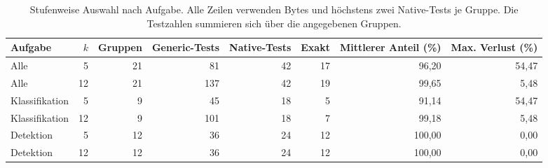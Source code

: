 \begin{table}[t]
\centering\small
\caption{Stufenweise Auswahl nach Aufgabe. Alle Zeilen verwenden Bytes und höchstens zwei Native-Tests je Gruppe. Die Testzahlen summieren sich über die angegebenen Gruppen.}
\label{tab:staged-task-budgets}
\begin{tabular}{@{}lrrrrrrr@{}}
\toprule
Aufgabe & $k$ & Gruppen & Generic-Tests & Native-Tests & Exakt & Mittlerer Anteil (\%) & Max. Verlust (\%) \\
\midrule
Alle & 5 & 21 & 81 & 42 & 17 & 96,20 & 54,47 \\
Alle & 12 & 21 & 137 & 42 & 19 & 99,65 & 5,48 \\
Klassifikation & 5 & 9 & 45 & 18 & 5 & 91,14 & 54,47 \\
Klassifikation & 12 & 9 & 101 & 18 & 7 & 99,18 & 5,48 \\
Detektion & 5 & 12 & 36 & 24 & 12 & 100,00 & 0,00 \\
Detektion & 12 & 12 & 36 & 24 & 12 & 100,00 & 0,00 \\
\bottomrule
\end{tabular}
\end{table}
